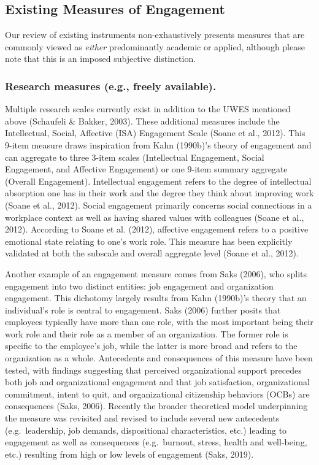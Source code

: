 \documentclass[
  man]{apa6}
\begin{document}
\hypertarget{existing-measures-of-engagement}{%
\subsection{Existing Measures of Engagement}\label{existing-measures-of-engagement}}

Our review of existing instruments non-exhaustively presents measures that are commonly viewed as \emph{either} predominantly academic or applied, although please note that this is an imposed subjective distinction.

\hypertarget{research-measures-e.g.-freely-available.}{%
\subsubsection{Research measures (e.g., freely available).}\label{research-measures-e.g.-freely-available.}}

Multiple research scales currently exist in addition to the UWES mentioned above (Schaufeli \& Bakker, 2003). These additional measures include the Intellectual, Social, Affective (ISA) Engagement Scale (Soane et al., 2012). This 9-item measure draws inspiration from Kahn (1990b)'s theory of engagement and can aggregate to three 3-item scales (Intellectual Engagement, Social Engagement, and Affective Engagement) or one 9-item summary aggregate (Overall Engagement). Intellectual engagement refers to the degree of intellectual absorption one has in their work and the degree they think about improving work (Soane et al., 2012). Social engagement primarily concerns social connections in a workplace context as well as having shared values with colleagues (Soane et al., 2012). According to Soane et al. (2012), affective engagement refers to a positive emotional state relating to one's work role. This measure has been explicitly validated at both the subscale and overall aggregate level (Soane et al., 2012).

Another example of an engagement measure comes from Saks (2006), who splits engagement into two distinct entities: job engagement and organization engagement. This dichotomy largely results from Kahn (1990b)'s theory that an individual's role is central to engagement. Saks (2006) further posits that employees typically have more than one role, with the most important being their work role and their role as a member of an organization. The former role is specific to the employee's job, while the latter is more broad and refers to the organization as a whole. Antecedents and consequences of this measure have been tested, with findings suggesting that perceived organizational support precedes both job and organizational engagement and that job satisfaction, organizational commitment, intent to quit, and organizational citizenship behaviors (OCBs) are consequences (Saks, 2006). Recently the broader theoretical model underpinning the measure was revisited and revised to include several new antecedents (e.g.~leadership, job demands, dispositional characteristics, etc.) leading to engagement as well as consequences (e.g.~burnout, stress, health and well-being, etc.) resulting from high or low levels of engagement (Saks, 2019).
\end{document}
